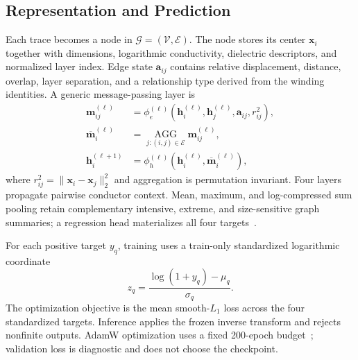 \documentclass[journal]{IEEEtran}
\begin{document}
\subsection{Representation and Prediction}
Each trace becomes a node in $\mathcal{G}=(\mathcal{V},\mathcal{E})$. The node stores its center $\mathbf{x}_i$ together with dimensions, logarithmic conductivity, dielectric descriptors, and normalized layer index. Edge state $\mathbf{a}_{ij}$ contains relative displacement, distance, overlap, layer separation, and a relationship type derived from the winding identities. A generic message-passing layer is
\begin{align}
\mathbf{m}_{ij}^{(\ell)}&=\phi_{e}^{(\ell)}\!\left(\mathbf{h}_{i}^{(\ell)},
\mathbf{h}_{j}^{(\ell)},\mathbf{a}_{ij},r_{ij}^{2}\right),\nonumber\\
\overline{\mathbf{m}}_{i}^{(\ell)}&=\operatorname*{AGG}_{j:(i,j)\in\mathcal{E}}
\mathbf{m}_{ij}^{(\ell)},\nonumber\\
\mathbf{h}_{i}^{(\ell+1)}&=\phi_{h}^{(\ell)}\!\left(
\mathbf{h}_{i}^{(\ell)},\overline{\mathbf{m}}_{i}^{(\ell)}\right),
\label{eq:message_passing}
\end{align}
where $r_{ij}^{2}=\|\mathbf{x}_{i}-\mathbf{x}_{j}\|_{2}^{2}$ and aggregation is permutation invariant. Four layers propagate pairwise conductor context. Mean, maximum, and log-compressed sum pooling retain complementary intensive, extreme, and size-sensitive graph summaries; a regression head materializes all four targets~\cite{gilmer}.

For each positive target $y_q$, training uses a train-only standardized logarithmic coordinate
\begin{equation}
z_q=\frac{\log(1+y_q)-\mu_q}{\sigma_q}.
\label{eq:target_transform}
\end{equation}
The optimization objective is the mean smooth-$L_1$ loss across the four standardized targets. Inference applies the frozen inverse transform and rejects nonfinite outputs. AdamW optimization uses a fixed 200-epoch budget~\cite{adamw}; validation loss is diagnostic and does not choose the checkpoint.
\end{document}
